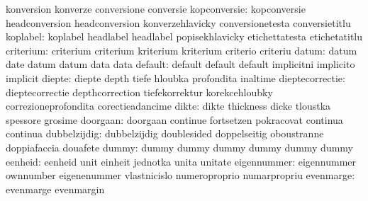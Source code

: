                            konversion                konverze
                           conversione               conversie
             kopconversie: kopconversie              headconversion
                           headconversion            konverzehlavicky
                           conversionetesta          conversietitlu %
                 koplabel: koplabel                  headlabel
                           headlabel                 popisekhlavicky
                           etichettatesta            etichetatitlu %
                criterium: criterium                 criterium
                           kriterium                 kriterium
                           criterio                  criteriu
                    datum: datum                     date
                           datum                     datum
                           data                      data
                  default: default                   default
                           default                   implicitni
                           implicito                 implicit
                   diepte: diepte                    depth
                           tiefe                     hloubka
                           profondita                inaltime
          dieptecorrectie: dieptecorrectie           depthcorrection
                           tiefekorrektur            korekcehloubky
                           correzioneprofondita      corectieadancime
                    dikte: dikte                     thickness
                           dicke                     tloustka
                           spessore                  grosime
                 doorgaan: doorgaan                  continue
                           fortsetzen                pokracovat
                           continua                  continua
             dubbelzijdig: dubbelzijdig              doublesided
                           doppelseitig              oboustranne
                           doppiafaccia              douafete
                    dummy: dummy                     dummy
                           dummy                     dummy
                           dummy                     dummy
                  eenheid: eenheid                   unit
                           einheit                   jednotka
                           unita                     unitate
              eigennummer: eigennummer               ownnumber
                           eigenenummer              vlastnicislo
                           numeroproprio             numarpropriu
                evenmarge: evenmarge                 evenmargin
